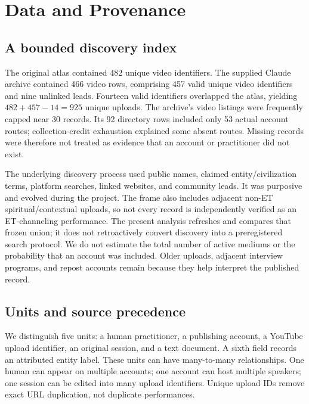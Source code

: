 \section{Data and Provenance}
\subsection{A bounded discovery index}
The original atlas contained 482 unique video identifiers. The supplied Claude archive contained 466 video rows, comprising 457 valid unique video identifiers and nine unlinked leads. Fourteen valid identifiers overlapped the atlas, yielding $482+457-14=925$ unique uploads. The archive's video listings were frequently capped near 30 records. Its 92 directory rows included only 53 actual account routes; collection-credit exhaustion explained some absent routes. Missing records were therefore not treated as evidence that an account or practitioner did not exist.

The underlying discovery process used public names, claimed entity/civilization terms, platform searches, linked websites, and community leads. It was purposive and evolved during the project. The frame also includes adjacent non-ET spiritual/contextual uploads, so not every record is independently verified as an ET-channeling performance. The present analysis refreshes and compares that frozen union; it does not retroactively convert discovery into a preregistered search protocol. We do not estimate the total number of active mediums or the probability that an account was included. Older uploads, adjacent interview programs, and repost accounts remain because they help interpret the published record.

\subsection{Units and source precedence}
We distinguish five units: a human practitioner, a publishing account, a YouTube upload identifier, an original session, and a text document. A sixth field records an attributed entity label. These units can have many-to-many relationships. One human can appear on multiple accounts; one account can host multiple speakers; one session can be edited into many upload identifiers. Unique upload IDs remove exact URL duplication, not duplicate performances.

